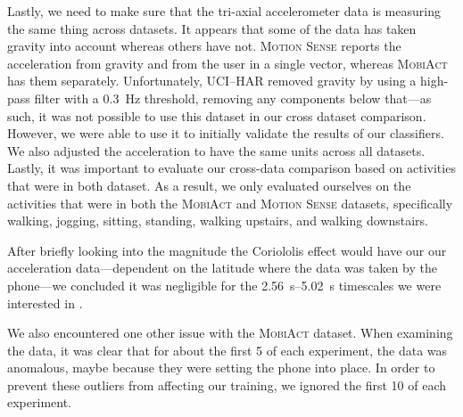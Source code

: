 Lastly, we need to make sure that the tri-axial accelerometer data is measuring the same thing across datasets. It appears that some of the data has taken gravity into account whereas others have not. \textsc{Motion Sense} reports the acceleration from gravity and from the user in a single vector, whereas  \textsc{MobiAct} has them separately. Unfortunately, \textsc{UCI--HAR} removed gravity by using a high-pass filter with a \SI{0.3}{\Hz} threshold, removing any components below that---as such, it was not possible to use this dataset in our cross dataset comparison. However, we were able to use it to initially validate the results of our classifiers. We also adjusted the acceleration to have the same units across all datasets. Lastly, it was important to evaluate our cross-data comparison based on activities that were in both dataset. As a result, we only evaluated ourselves on  the activities that were in both the \textsc{MobiAct} and \textsc{Motion Sense} datasets, specifically walking, jogging, sitting, standing, walking upstairs, and walking downstairs.

After briefly looking into the magnitude the Coriololis effect would have our our acceleration data---dependent on the latitude where the data was taken by the phone---we concluded it was negligible for the \SIrange{2.56}{5.02}{\s} timescales we were interested in \cite{apel1987principles}.

We also encountered one other issue with the \textsc{MobiAct} dataset. When examining the data, it was clear that for about the first 5 \s of each experiment, the data was anomalous, maybe because they were setting the phone into place. In order to prevent these outliers from affecting our training, we ignored the first 10 \s of each experiment.

